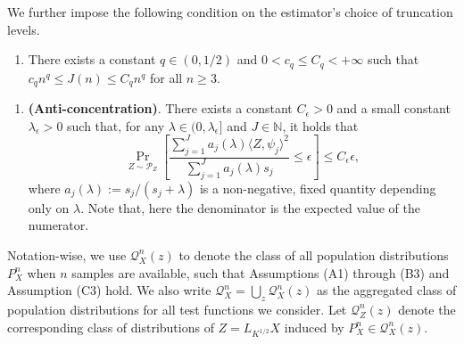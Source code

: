 \documentclass[aos]{imsart}
\theoremstyle{plain}
\theoremstyle{definition}
\theoremstyle{definition}
\begin{document}
We further impose the following condition on the estimator's choice of truncation levels.
\begin{enumerate}
\item[(C2)] There exists a constant $q\in(0,1/2)$ and $0<c_q\leq C_q<+\infty$ such that $c_q n^q\leq J(n)\leq C_q n^q$ for all $n\geq 3$.
\end{enumerate}

{\color{orange}
\begin{enumerate}
\item[(C3)] \textbf{(Anti-concentration)}. There exists a constant $C_\epsilon>0$ and a small constant $\lambda_\epsilon>0$ such that, for any $\lambda\in(0,\lambda_\epsilon]$ and $J\in\mathbb N$,
it holds that
$$
\Pr_{Z\sim \mathcal P_Z}\left[\frac{\sum_{j=1}^{J} a_j(\lambda)\langle Z,\psi_j\rangle^2}{\sum_{j=1}^{J} a_j(\lambda)s_j} \leq \epsilon\right] \leq C_\epsilon \epsilon,
$$
where $a_j(\lambda) := s_j/(s_j+\lambda)$ is a non-negative, fixed quantity depending only on $\lambda$.
Note that, here the denominator is the expected value of the numerator.
\end{enumerate}
}

Notation-wise, we use $\mathcal Q_X^n(z)$ to denote the class of all population distributions $P_X^n$ when $n$ samples are available, such that Assumptions (A1) through (B3) and Assumption (C3) hold.
We also write $\mathcal Q_X^n = \bigcup_{z}\mathcal Q_X^n(z)$ as the aggregated class of population distributions for all test functions we consider.
Let $\mathcal Q_Z^n(z)$ denote the corresponding class of distributions of $Z=L_{K^{1/2}}X$ induced by $P_X^n\in\mathcal Q_X^n(z)$.
\end{document}
